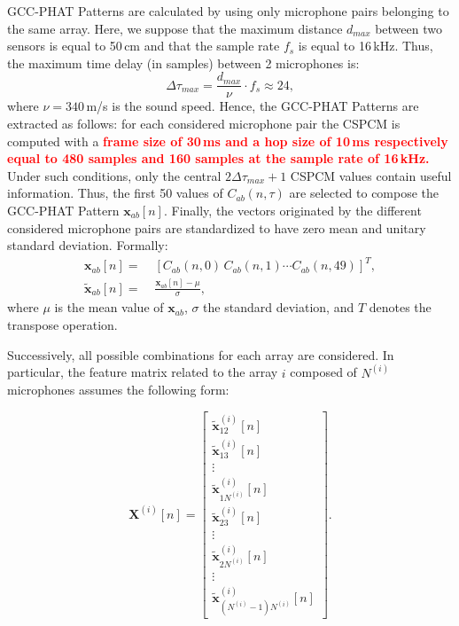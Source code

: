 \documentclass[review]{elsarticle}
\begin{document}
GCC-PHAT Patterns are calculated by using only microphone pairs belonging to the same array. Here, we suppose that the maximum distance $d_{max}$ between two sensors is equal to  50\,cm and that the sample rate $f_s$ is equal to 16\,kHz. Thus, the maximum time delay (in samples) between 2 microphones is:
\begin{equation}
\label{eq:TOA}
\Delta\tau_{max} = \frac{d_{max}}{\nu} \cdot f_s \approx 24,
\end{equation} 
where $\nu=340$\,m/s is the sound speed.
Hence, the GCC-PHAT Patterns are extracted as follows: for each considered microphone pair the CSPCM is computed with a \textcolor{red}{\textbf{frame size of 30\,ms and a hop size of 10\,ms respectively equal to 480 samples and 160 samples at the sample rate of 16\,kHz.}} %
Under such conditions, only the central $2\Delta\tau_{max} + 1$ CSPCM values contain useful information. Thus, the first 50 values of $C_{ab}(n,\tau)$ are selected to compose the GCC-PHAT Pattern $\mathbf{x}_{ab}[n]$. 
Finally, the vectors originated by the different considered microphone pairs are standardized to have zero mean and unitary standard deviation.
Formally: 
\begin{align}
\mathbf{x}_{ab}[n] = & \;  [C_{ab}(n,0)\,C_{ab}(n,1) \cdots C_{ab}(n,49)]^T,\\
\tilde{\mathbf{x}}_{ab}[n] =  & \;  \frac{\mathbf{x}_{ab}[n] - \mu}{\sigma},
\end{align}
where $\mu$ is the mean value of $\mathbf{x}_{ab}$, $\sigma$ the standard deviation, and $T$ denotes the transpose operation.

Successively, all possible combinations for each array are considered. In particular, the feature matrix related to the array $i$ composed of $N^{(i)}$ microphones assumes the following form:

\begin{equation}
\mathbf{X}^{(i)}[n] =   \begin{bmatrix} \tilde{\mathbf{x}}_{12}^{(i)}[n] \\ \tilde{\mathbf{x}}_{13}^{(i)}[n] \\ \vdots\\ \tilde{\mathbf{x}}_{1N^{(i)}}^{(i)}[n] \\ \tilde{\mathbf{x}}_{23}^{(i)}[n] \\\vdots \\ \tilde{\mathbf{x}}_{2N^{(i)}}^{(i)}[n] \\ \vdots \\  \tilde{\mathbf{x}}_{(N^{(i)}-1)N^{(i)}}^{(i)}[n] \end{bmatrix}.
\end{equation}
\end{document}
